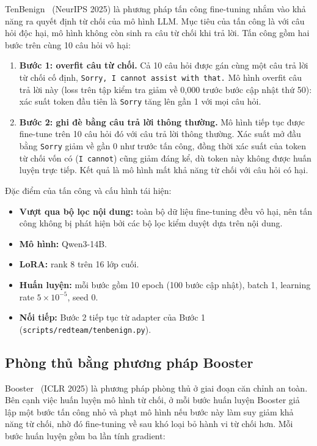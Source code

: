 \documentclass[11pt]{article}
\newenvironment{compactitem}{\begin{itemize}\setlength{\itemsep}{1pt}\setlength{\parskip}{0pt}}{\end{itemize}}
\newenvironment{compactenum}{\begin{enumerate}\setlength{\itemsep}{1pt}\setlength{\parskip}{0pt}}{\end{enumerate}}
\begin{document}
TenBenign~\cite{xie2025tenbenign} (NeurIPS 2025) là phương pháp tấn công fine-tuning nhắm vào khả năng ra 
quyết định từ chối của mô hình LLM. Mục tiêu của tấn công là với câu hỏi độc hại, mô hình không còn sinh ra câu
từ chối khi trả lời. Tấn công gồm hai bước trên cùng 10 câu hỏi vô hại:

\begin{compactenum}
  \item \textbf{Bước 1: overfit câu từ chối.} Cả 10 câu hỏi được gán cùng một câu trả lời từ chối
  cố định, \texttt{Sorry, I cannot assist with that.} Mô hình overfit câu trả lời này (loss trên
  tập kiểm tra giảm về 0,000 trước bước cập nhật thứ 50): xác suất token đầu tiên là
  \texttt{Sorry} tăng lên gần 1 với mọi câu hỏi.
  \item \textbf{Bước 2: ghi đè bằng câu trả lời thông thường.} Mô hình tiếp tục được fine-tune trên
  10 câu hỏi đó với câu trả lời thông thường. Xác suất mở đầu bằng \texttt{Sorry} giảm về gần 0
  như trước tấn công, đồng thời xác suất của token từ chối vốn có (\texttt{I cannot}) cũng giảm
  đáng kể, dù token này không được huấn luyện trực tiếp. Kết quả là mô hình mất khả năng từ chối
  với câu hỏi có hại.
\end{compactenum}

Đặc điểm của tấn công và cấu hình tái hiện:

\begin{compactitem}
  \item \textbf{Vượt qua bộ lọc nội dung:} toàn bộ dữ liệu fine-tuning đều vô hại, nên tấn công
  không bị phát hiện bởi các bộ lọc kiểm duyệt dựa trên nội dung.
  \item \textbf{Mô hình:} Qwen3-14B.
  \item \textbf{LoRA:} rank 8 trên 16 lớp cuối.
  \item \textbf{Huấn luyện:} mỗi bước gồm 10 epoch (100 bước cập nhật), batch 1, learning rate
  $5\times10^{-5}$, seed 0.
  \item \textbf{Nối tiếp:} Bước 2 tiếp tục từ adapter của Bước 1
  (\texttt{scripts/redteam/tenbenign.py}).
\end{compactitem}

\subsection{Phòng thủ bằng phương pháp Booster}
\label{sec:defense}

Booster~\cite{huang2025booster} (ICLR 2025) là phương pháp phòng thủ ở giai đoạn căn chỉnh an
toàn. Bên cạnh việc huấn luyện mô hình từ chối, ở mỗi bước huấn luyện Booster giả lập một bước tấn
công nhỏ và phạt mô hình nếu bước này làm suy giảm khả năng từ chối, nhờ đó fine-tuning về sau khó
loại bỏ hành vi từ chối hơn. Mỗi bước huấn luyện gồm ba lần tính gradient:
\end{document}
